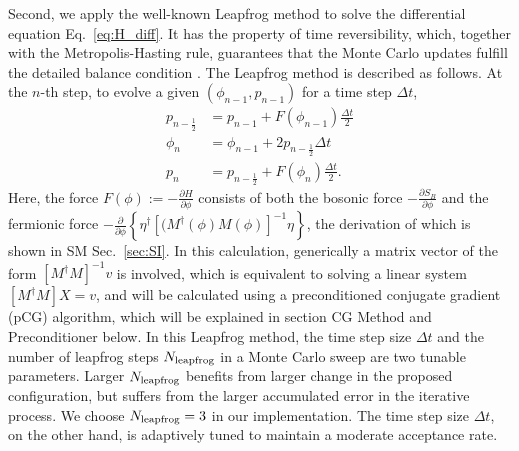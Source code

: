 \documentclass[aps,prl,twocolumn,superscriptaddress,showpacs,longbibliography]{revtex4-2}
\newcommand{\tx}[1]{\textmd{#1}}
\newcommand{\onefrac}[1]{\frac{1}{#1}}
\newcommand{\leftc}{\left\{ }
\newcommand{\rightc}{\right\} }
\newcommand{\leftr}{\left[}
\newcommand{\rightr}{\right]}
\newcommand{\nn}{\nonumber}
\begin{document}
Second, we apply the well-known Leapfrog method \cite{Beyl2018} to solve the differential equation Eq.~\eqref{eq:H_diff}.
It has the property of time reversibility, which, together with the Metropolis-Hasting rule, guarantees that the Monte Carlo updates fulfill the detailed balance condition \cite{Beyl2018}. The Leapfrog method is described as follows. At the $n$-th step, to evolve a given $(\phi_{n-1}, p_{n-1})$ for a time step $\Delta t$,
\begin{align}
p_{n-\onefrac{2}} & =p_{n-1}+F\left(\phi_{n-1}\right) \frac{\Delta t}{2} \nn \\
\phi_{n} & = \phi_{n-1} + 2 p_{n-\onefrac{2}} \Delta t  \label{eq:leapfrog} \\
p_{n} & =p_{n-\onefrac{2}} + F\left(\phi_{n}\right)\frac{\Delta t}{2}. \nn
\end{align}
Here, the force $F(\phi) := - \frac{\partial H}{\partial \phi}$ consists of both the bosonic force $ -\frac{\partial S_B}{\partial \phi}$ and the fermionic force $-\frac{\partial }{\partial \phi} \leftc\eta^{\dagger}\leftr (M^{\dagger}(\phi) M(\phi)\rightr^{-1} \eta\rightc$, the derivation of which is shown in SM Sec.~\ref{sec:SI}. In this calculation, generically a matrix vector of the form $\left[M^{\dagger}M\right]^{-1} v$ is involved, which is equivalent to solving a linear system $\left[M^{\dagger}M\right] X = v$, and will be calculated using a preconditioned conjugate gradient (pCG) algorithm, which will be explained in section CG Method and Preconditioner below. In this Leapfrog method, the time step size $\Delta t$ and the number of leapfrog steps $N_\tx{leapfrog}$ in a Monte Carlo sweep are two tunable parameters. Larger $N_\tx{leapfrog}$ benefits from larger change in the proposed configuration, but suffers from the larger accumulated error in the iterative process. We choose $N_\tx{leapfrog} = 3$ in our implementation. The time step size $\Delta t$, on the other hand, is adaptively tuned to maintain a moderate acceptance rate.
\end{document}
